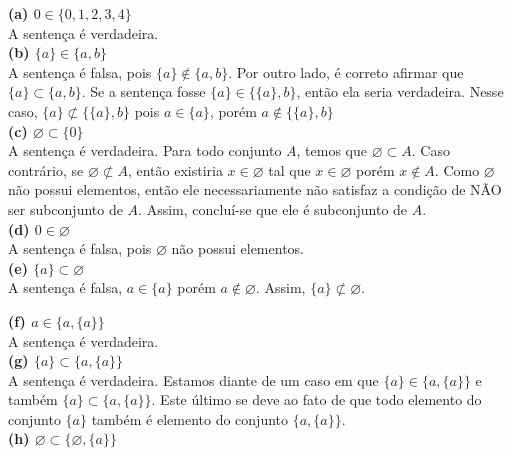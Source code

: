 \documentclass[12pt, a4paper]{article}
\begin{document}
\textbf{(a) \(0 \in \{0,1,2,3,4\}\)} \\

A sentença é verdadeira.\\

\textbf{(b) \(\{a\} \in \{a,b\}\)} \\

A sentença é falsa, pois \(\{a\} \notin \{a,b\}\). Por outro lado, é correto afirmar que \(\{a\} \subset \{a,b\}\). Se a sentença fosse \(\{a\} \in \{\{a\},b\}\), então ela seria verdadeira. Nesse caso, \(\{a\} \not \subset \{\{a\},b\}\) pois \(a \in \{a\}\), porém \(a \notin \{\{a\},b\}\)\\

\textbf{(c) \(\varnothing \subset \{0\}\)} \\

A sentença é verdadeira. Para todo conjunto \(A\), temos que \(\varnothing \subset A\). Caso contrário, se \(\varnothing \not \subset A\), então existiria \(x \in \varnothing\) tal que \(x \in \varnothing\) porém \(x \notin A\). Como \(\varnothing\) não possui elementos, então ele necessariamente não satisfaz a condição de NÃO ser subconjunto de \(A\). Assim, concluí-se que ele é subconjunto de \(A\). \\

\textbf{(d) \(0 \in \varnothing\)} \\

A sentença é falsa, pois \(\varnothing\) não possui elementos. \\

\textbf{(e) \(\{a\} \subset \varnothing\)} \\

A sentença é falsa, \(a \in \{a\}\) porém \(a \notin \varnothing\). Assim, \(\{a\} \not \subset \varnothing\).

\textbf{(f) \(a \in \{a,\{a\}\}\)} \\

A sentença é verdadeira. \\

\textbf{(g) \(\{a\} \subset \{a,\{a\}\}\)} \\

A sentença é verdadeira. Estamos diante de um caso em que \(\{a\} \in \{a,\{a\}\}\) e também \(\{a\} \subset \{a, \{a\}\}\). Este último se deve ao fato de que todo elemento do conjunto \(\{a\}\) também é elemento do conjunto \(\{a, \{a\}\}\). \\

\textbf{(h) \(\varnothing \subset \{\varnothing, \{a\}\}\)} \\
\end{document}
